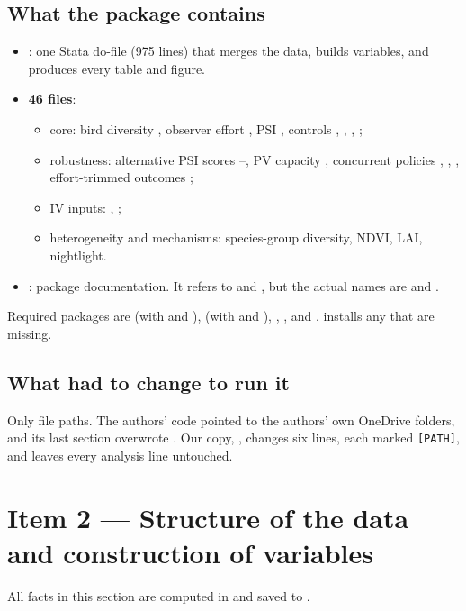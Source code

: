 \documentclass[11pt]{article}
\begin{document}
\subsection{What the package contains}
\begin{itemize}
\item {}: one Stata do-file (975 lines) that merges the data, builds variables, and produces every table and figure.
\item \textbf{46  files}:
  \begin{itemize}
  \item core: bird diversity , observer effort , PSI , controls , , , ;
  \item robustness: alternative PSI scores --, PV capacity , concurrent policies , , , effort-trimmed outcomes ;
  \item IV inputs: , ;
  \item heterogeneity and mechanisms: species-group diversity, NDVI, LAI, nightlight.
  \end{itemize}
\item {}: package documentation. It refers to  and , but the actual names are  and .
\end{itemize}
Required packages are  (with  and ),  (with  and ), , ,  and .  installs any that are missing.

\subsection{What had to change to run it}
Only file paths. The authors' code pointed to the authors' own OneDrive folders, and its last section overwrote . Our copy, , changes six lines, each marked \texttt{[PATH]}, and leaves every analysis line untouched.

\section{Item 2 --- Structure of the data and construction of variables}
All facts in this section are computed in  and saved to .
\end{document}
